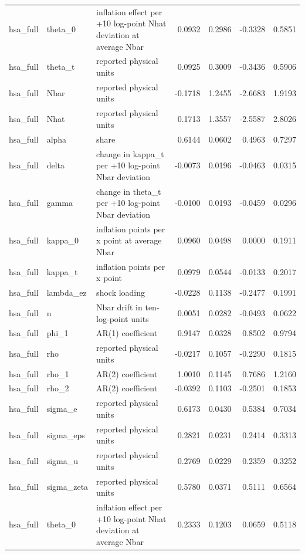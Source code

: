 \begin{tabular}{lllrrrr}
hsa\_full & theta\_0 & inflation effect per +10 log-point Nhat deviation at average Nbar & 0.0932 & 0.2986 & -0.3328 & 0.5851 \\
hsa\_full & theta\_t & reported physical units & 0.0925 & 0.3009 & -0.3436 & 0.5906 \\
hsa\_full & Nbar & reported physical units & -0.1718 & 1.2455 & -2.6683 & 1.9193 \\
hsa\_full & Nhat & reported physical units & 0.1713 & 1.3557 & -2.5587 & 2.8026 \\
hsa\_full & alpha & share & 0.6144 & 0.0602 & 0.4963 & 0.7297 \\
hsa\_full & delta & change in kappa\_t per +10 log-point Nbar deviation & -0.0073 & 0.0196 & -0.0463 & 0.0315 \\
hsa\_full & gamma & change in theta\_t per +10 log-point Nbar deviation & -0.0100 & 0.0193 & -0.0459 & 0.0296 \\
hsa\_full & kappa\_0 & inflation points per x point at average Nbar & 0.0960 & 0.0498 & 0.0000 & 0.1911 \\
hsa\_full & kappa\_t & inflation points per x point & 0.0979 & 0.0544 & -0.0133 & 0.2017 \\
hsa\_full & lambda\_ez & shock loading & -0.0228 & 0.1138 & -0.2477 & 0.1991 \\
hsa\_full & n & Nbar drift in ten-log-point units & 0.0051 & 0.0282 & -0.0493 & 0.0622 \\
hsa\_full & phi\_1 & AR(1) coefficient & 0.9147 & 0.0328 & 0.8502 & 0.9794 \\
hsa\_full & rho & reported physical units & -0.0217 & 0.1057 & -0.2290 & 0.1815 \\
hsa\_full & rho\_1 & AR(2) coefficient & 1.0010 & 0.1145 & 0.7686 & 1.2160 \\
hsa\_full & rho\_2 & AR(2) coefficient & -0.0392 & 0.1103 & -0.2501 & 0.1853 \\
hsa\_full & sigma\_e & reported physical units & 0.6173 & 0.0430 & 0.5384 & 0.7034 \\
hsa\_full & sigma\_eps & reported physical units & 0.2821 & 0.0231 & 0.2414 & 0.3313 \\
hsa\_full & sigma\_u & reported physical units & 0.2769 & 0.0229 & 0.2359 & 0.3252 \\
hsa\_full & sigma\_zeta & reported physical units & 0.5780 & 0.0371 & 0.5111 & 0.6564 \\
hsa\_full & theta\_0 & inflation effect per +10 log-point Nhat deviation at average Nbar & 0.2333 & 0.1203 & 0.0659 & 0.5118 \\

\end{tabular}
